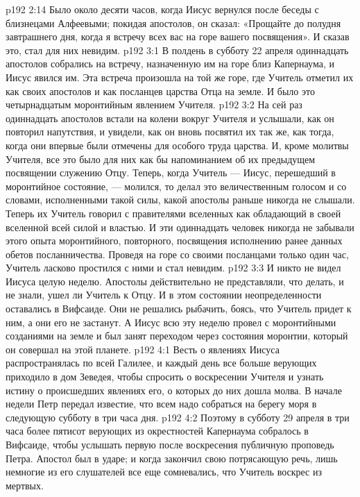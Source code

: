 \vs p192 2:14 \pc Было около десяти часов, когда Иисус вернулся после беседы с близнецами Алфеевыми; покидая апостолов, он сказал: «Прощайте до полудня завтрашнего дня, когда я встречу всех вас на горе вашего посвящения». И сказав это, стал для них невидим.
\vs p192 3:1 В полдень в субботу 22 апреля одиннадцать апостолов собрались на встречу, назначенную им на горе близ Капернаума, и Иисус явился им. Эта встреча произошла на той же горе, где Учитель отметил их как своих апостолов и как посланцев царства Отца на земле. И было это четырнадцатым моронтийным явлением Учителя.
\vs p192 3:2 На сей раз одиннадцать апостолов встали на колени вокруг Учителя и услышали, как он повторил напутствия, и увидели, как он вновь посвятил их так же, как тогда, когда они впервые были отмечены для особого труда царства. И, кроме молитвы Учителя, все это было для них как бы напоминанием об их предыдущем посвящении служению Отцу. Теперь, когда Учитель --- Иисус, перешедший в моронтийное состояние, --- молился, то делал это величественным голосом и со словами, исполненными такой силы, какой апостолы раньше никогда не слышали. Теперь их Учитель говорил с правителями вселенных как обладающий в своей вселенной всей силой и властью. И эти одиннадцать человек никогда не забывали этого опыта моронтийного, повторного, посвящения исполнению ранее данных обетов посланничества. Проведя на горе со своими посланцами только один час, Учитель ласково простился с ними и стал невидим.
\vs p192 3:3 \pc И никто не видел Иисуса целую неделю. Апостолы действительно не представляли, что делать, и не знали, ушел ли Учитель к Отцу. И в этом состоянии неопределенности оставались в Вифсаиде. Они не решались рыбачить, боясь, что Учитель придет к ним, а они его не застанут. А Иисус всю эту неделю провел с моронтийными созданиями на земле и был занят переходом через состояния моронтии, который он совершал на этой планете.
\vs p192 4:1 Весть о явлениях Иисуса распространялась по всей Галилее, и каждый день все больше верующих приходило в дом Зеведея, чтобы спросить о воскресении Учителя и узнать истину о происшедших явлениях его, о которых до них дошла молва. В начале недели Петр передал известие, что всем надо собраться на берегу моря в следующую субботу в три часа дня.
\vs p192 4:2 Поэтому в субботу 29 апреля в три часа более пятисот верующих из окрестностей Капернаума собралось в Вифсаиде, чтобы услышать первую после воскресения публичную проповедь Петра. Апостол был в ударе; и когда закончил свою потрясающую речь, лишь немногие из его слушателей все еще сомневались, что Учитель воскрес из мертвых.
